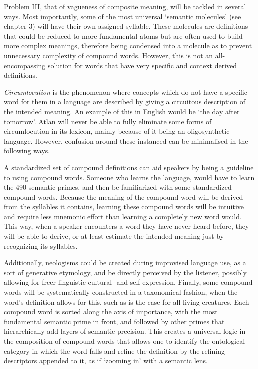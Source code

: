 Problem III, that of vagueness of composite meaning, will be tackled in several ways. Most importantly, some of the most universal ‘semantic molecules’ (see chapter 3) will have their own assigned syllable. These molecules are definitions that could be reduced to more fundamental atoms but are often used to build more complex meanings, therefore being condensed into a molecule as to prevent unnecessary complexity of compound words. However, this is not an all-encompassing solution for words that have very specific and context derived definitions. 

{\it Circumlocution} is the phenomenon where concepts which do not have a specific word for them in a language are described by giving a circuitous description of the intended meaning. An example of this in English would be ‘the day after tomorrow’. Atlan will never be able to fully eliminate some forms of circumlocution in its lexicon, mainly because of it being an oligosynthetic language. However, confusion around these instanced can be minimalised in the following ways.  

A standardized set of compound definitions can aid speakers by being a guideline to using compound words. Someone who learns the language, would have to learn the 490 semantic primes, and then be familiarized with some standardized compound words. Because the meaning of the compound word will be derived from the syllables it contains, learning these compound words will be intuitive and require less mnemonic effort than learning a completely new word would. This way, when a speaker encounters a word they have never heard before, they will be able to derive, or at least estimate the intended meaning just by recognizing its syllables.

Additionally, neologisms could be created during improvised language use, as a sort of generative etymology, and be directly perceived by the listener, possibly allowing for freer linguistic cultural- and self-expression. Finally, some compound words will be systematically constructed in a taxonomical fashion, when the word’s definition allows for this, such as is the case for all living creatures. Each compound word is sorted along the axis of importance, with the most fundamental semantic prime in front, and followed by other primes that hierarchically add layers of semantic precision. This creates a universal logic in the composition of compound words that allows one to identify the ontological category in which the word falls and refine the definition by the refining descriptors appended to it, as if ‘zooming in’ with a semantic lens.


